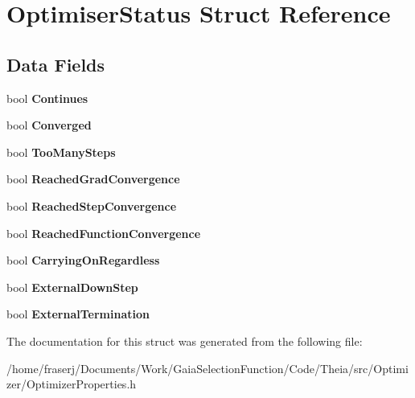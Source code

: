 \hypertarget{structOptimiserStatus}{}\section{Optimiser\+Status Struct Reference}
\label{structOptimiserStatus}
\subsection*{Data Fields}
\begin{DoxyCompactItemize}
\item 
\mbox{\label{structOptimiserStatus_a7d45c2a7646e88ac74e2f81131f82dd2}} 
bool {\bfseries Continues}
\item 
\mbox{\label{structOptimiserStatus_a70321c01ac661dabf5b180031e9b8bb2}} 
bool {\bfseries Converged}
\item 
\mbox{\label{structOptimiserStatus_a9fa1878474d02076b4ec867808abaa3e}} 
bool {\bfseries Too\+Many\+Steps}
\item 
\mbox{\label{structOptimiserStatus_a58d7f4f4f10a4b1059b8290b6486e0d5}} 
bool {\bfseries Reached\+Grad\+Convergence}
\item 
\mbox{\label{structOptimiserStatus_a854bfaef4df67e031069a00b6325ca86}} 
bool {\bfseries Reached\+Step\+Convergence}
\item 
\mbox{\label{structOptimiserStatus_a2c0efe44cd78260c25e9e4551cfb9fa6}} 
bool {\bfseries Reached\+Function\+Convergence}
\item 
\mbox{\label{structOptimiserStatus_ab4b142d6d72ddfd87174278faa7901ae}} 
bool {\bfseries Carrying\+On\+Regardless}
\item 
\mbox{\label{structOptimiserStatus_af46b372523642690c97fe310dd04efdb}} 
bool {\bfseries External\+Down\+Step}
\item 
\mbox{\label{structOptimiserStatus_a29dda78a363c436d68fbd5eb342cd862}} 
bool {\bfseries External\+Termination}
\end{DoxyCompactItemize}


The documentation for this struct was generated from the following file\+:\begin{DoxyCompactItemize}
\item 
/home/fraserj/\+Documents/\+Work/\+Gaia\+Selection\+Function/\+Code/\+Theia/src/\+Optimizer/Optimizer\+Properties.\+h\end{DoxyCompactItemize}
